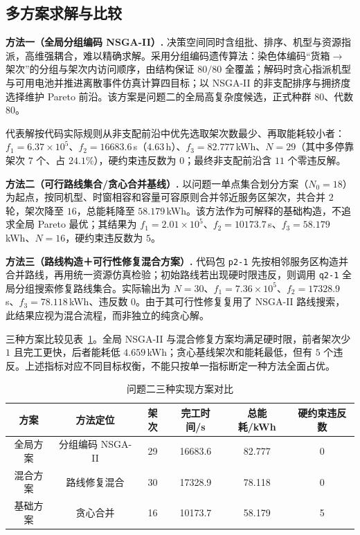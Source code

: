 \subsection{多方案求解与比较}

\textbf{方法一（全局分组编码 NSGA-II）.} 决策空间同时含组批、排序、机型与资源指派，高维强耦合，难以精确求解。采用分组编码遗传算法：染色体编码“货箱$\to$架次”的分组与架次内访问顺序，由结构保证 $80/80$ 全覆盖；解码时贪心指派机型与可用电池并推进离散事件仿真计算四目标；以 NSGA-II 的非支配排序与拥挤度选择维护 Pareto 前沿。该方案是问题二的全局高复杂度候选，正式种群 $80$、代数 $80$。

代表解按代码实际规则从非支配前沿中优先选取架次数最少、再取能耗较小者：$f_1=6.37\times10^{5}$、$f_2=16683.6\,$s（$4.63\,$h）、$f_3=82.777\,$kWh、$N=29$（其中多停靠架次 $7$ 个、占 $24.1\%$），硬约束违反数为 $0$；最终非支配前沿含 $11$ 个零违反解。

\textbf{方法二（可行路线集合/贪心合并基线）.} 以问题一单点集合划分方案（$N_0=18$）为起点，按同机型、时窗相容和容量可容原则合并邻近服务区架次，共合并 $2$ 轮，架次降至 $16$，总能耗降至 $58.179\,$kWh。该方法作为可解释的基础构造，不追求全局 Pareto 最优；其结果为 $f_1=2.01\times10^{5}$、$f_2=10173.7\,$s、$f_3=58.179\,$kWh、$N=16$，硬约束违反数为 $5$。

\textbf{方法三（路线构造＋可行性修复混合方案）.} 代码包 \texttt{p2-1} 先按相邻服务区构造并合并路线，再用统一资源仿真检验；初始路线若出现硬时限违反，则调用 \texttt{q2-1} 全局分组搜索修复路线集合。实际输出为 $N=30$、$f_1=7.36\times10^{5}$、$f_2=17328.9\,$s、$f_3=78.118\,$kWh、违反数 $0$。由于其可行性修复复用了 NSGA-II 路线搜索，此结果应视为混合流程，而非独立的纯贪心解。

三种方案比较见表~\ref{tab:q2_methods}。全局 NSGA-II 与混合修复方案均满足硬时限，前者架次少 $1$ 且完工更快，后者能耗低 $4.659\,$kWh；贪心基线架次和能耗最低，但有 $5$ 个违反。上述指标对应不同目标权衡，不能只按单一指标断定一种方法全面占优。

\begin{table}[htbp]
\centering
\caption{问题二三种实现方案对比}
\label{tab:q2_methods}
\renewcommand{\arraystretch}{1.2}
\small
\begin{tabular}{c|c|c|c|c|c}
\toprule
方案 & 方法定位 & 架次 & 完工时间/s & 总能耗/kWh & 硬约束违反数 \\
\midrule
全局方案 & 分组编码 NSGA-II & 29 & 16683.6 & 82.777 & 0 \\
混合方案 & 路线修复混合 & 30 & 17328.9 & 78.118 & 0 \\
基础方案 & 贪心合并 & 16 & 10173.7 & 58.179 & 5 \\
\bottomrule
\end{tabular}
\end{table}

